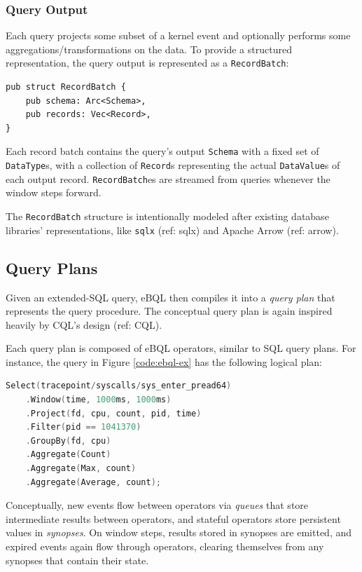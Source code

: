 \subsubsection{Query Output}

Each query projects some subset of a kernel event and optionally performs some
aggregations/transformations on the data. To provide a structured representation, the query output
is represented as a \texttt{RecordBatch}:
\begin{lstlisting}
pub struct RecordBatch {
    pub schema: Arc<Schema>,
    pub records: Vec<Record>,
}
\end{lstlisting}

Each record batch contains the query's output \texttt{Schema} with a fixed set of
\texttt{DataType}s, with a collection of \texttt{Record}s representing the actual
\texttt{DataValue}s of each output record. \texttt{RecordBatch}es are streamed from queries whenever
the window steps forward.

The \texttt{RecordBatch} structure is intentionally modeled after existing database libraries'
representations, like \texttt{sqlx} (ref: sqlx) and Apache Arrow (ref: arrow).

\label{data-rep-out}

\subsection{Query Plans}

Given an extended-SQL query, eBQL then compiles it into a \textit{query plan} that represents the
query procedure. The conceptual query plan is again inspired heavily by CQL's design (ref: CQL).

Each query plan is composed of eBQL operators, similar to SQL query plans. For instance, the query
in Figure \ref{code:ebql-ex} has the following logical plan:

\begin{lstlisting}[language=C]
Select(tracepoint/syscalls/sys_enter_pread64)
    .Window(time, 1000ms, 1000ms)
    .Project(fd, cpu, count, pid, time)
    .Filter(pid == 1041370)
    .GroupBy(fd, cpu)
    .Aggregate(Count)
    .Aggregate(Max, count)
    .Aggregate(Average, count);
\end{lstlisting}

Conceptually, new events flow between operators via \textit{queues} that store intermediate results
between operators, and stateful operators store persistent values in \textit{synopses}. On window
steps, results stored in synopses are emitted, and expired events again flow through operators,
clearing themselves from any synopses that contain their state.

